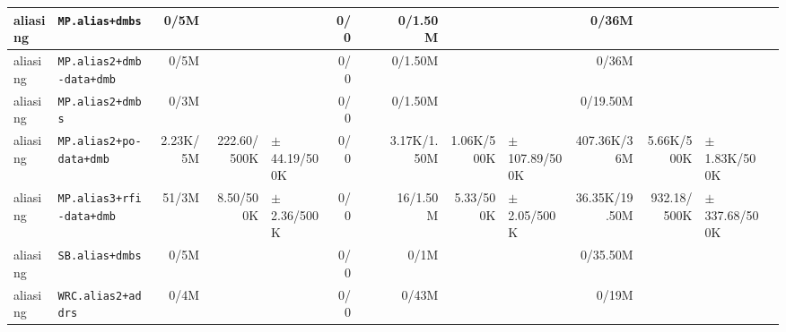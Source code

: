 \begin{tabular}{l l  | r r l | r r l | r r l | r r l l}
        aliasing &                                       \verb|MP.alias+dmbs| &           0/5M &                       &                   &            0/0 &                       &                 &        0/1.50M &                       &                   &          0/36M &                       &                   & \\ \hline 
        aliasing &                              \verb|MP.alias2+dmb-data+dmb| &           0/5M &                       &                   &            0/0 &                       &                 &        0/1.50M &                       &                   &          0/36M &                       &                   & \\ \hline 
        aliasing &                                      \verb|MP.alias2+dmbs| &           0/3M &                       &                   &            0/0 &                       &                 &        0/1.50M &                       &                   &       0/19.50M &                       &                   & \\ \hline 
        aliasing &                               \verb|MP.alias2+po-data+dmb| &       2.23K/5M &           222.60/500K &  $\pm$ 44.19/500K &            0/0 &                       &                 &    3.17K/1.50M &            1.06K/500K & $\pm$ 107.89/500K &    407.36K/36M &            5.66K/500K &  $\pm$ 1.83K/500K & \\ \hline 
        aliasing &                              \verb|MP.alias3+rfi-data+dmb| &          51/3M &             8.50/500K &   $\pm$ 2.36/500K &            0/0 &                       &                 &       16/1.50M &             5.33/500K &   $\pm$ 2.05/500K &  36.35K/19.50M &           932.18/500K & $\pm$ 337.68/500K & \\ \hline 
        aliasing &                                       \verb|SB.alias+dmbs| &           0/5M &                       &                   &            0/0 &                       &                 &           0/1M &                       &                   &       0/35.50M &                       &                   & \\ \hline 
        aliasing &                                    \verb|WRC.alias2+addrs| &           0/4M &                       &                   &            0/0 &                       &                 &          0/43M &                       &                   &          0/19M &                       &                   & \\ \hline 

\end{tabular}
